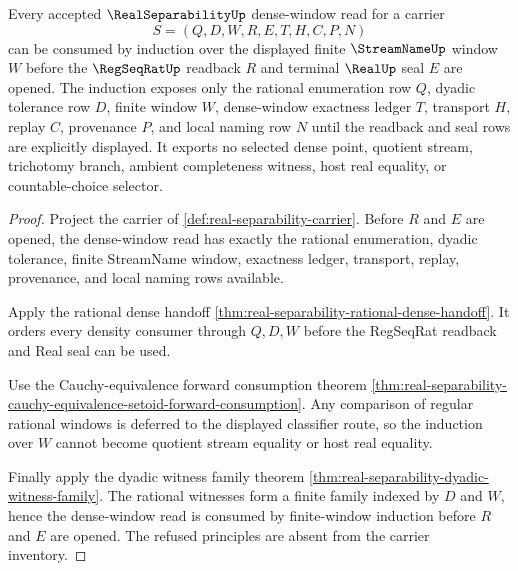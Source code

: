 \begin{theorem}
\label{thm:real-separability-regseqrat-dense-window-induction}
Every accepted $\RealSeparabilityUp$ dense-window read for a carrier
$$
S=(Q,D,W,R,E,T,H,C,P,N)
$$
can be consumed by induction over the displayed finite $\StreamNameUp$ window $W$ before the $\RegSeqRatUp$ readback $R$ and terminal $\RealUp$ seal $E$ are opened. The induction exposes only the rational enumeration row $Q$, dyadic tolerance row $D$, finite window $W$, dense-window exactness ledger $T$, transport $H$, replay $C$, provenance $P$, and local naming row $N$ until the readback and seal rows are explicitly displayed. It exports no selected dense point, quotient stream, trichotomy branch, ambient completeness witness, host real equality, or countable-choice selector.
\end{theorem}
\begin{proof}
Project the carrier of \autoref{def:real-separability-carrier}. Before $R$ and $E$ are opened, the dense-window read has exactly the rational enumeration, dyadic tolerance, finite StreamName window, exactness ledger, transport, replay, provenance, and local naming rows available.

Apply the rational dense handoff \autoref{thm:real-separability-rational-dense-handoff}. It orders every density consumer through $Q,D,W$ before the RegSeqRat readback and Real seal can be used.

Use the Cauchy-equivalence forward consumption theorem \autoref{thm:real-separability-cauchy-equivalence-setoid-forward-consumption}. Any comparison of regular rational windows is deferred to the displayed classifier route, so the induction over $W$ cannot become quotient stream equality or host real equality.

Finally apply the dyadic witness family theorem \autoref{thm:real-separability-dyadic-witness-family}. The rational witnesses form a finite family indexed by $D$ and $W$, hence the dense-window read is consumed by finite-window induction before $R$ and $E$ are opened. The refused principles are absent from the carrier inventory.
\end{proof}


